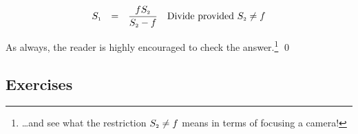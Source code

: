 \documentclass{ximera}
\begin{document}
\begin{example}
\begin{enumerate}
\[\begin{array}{rclr}
S_{\text{\tiny $1$}} & = & \dfrac{f S_{\text{\tiny $2$}}}{S_{\text{\tiny $2$}} - f} & \text{Divide provided  $S_{\text{\tiny $2$}} \neq f$}  \\

\end{array}\]

As always, the reader is highly encouraged to check the answer.\footnote{\ldots and see what the restriction $S_{\text{\tiny $2$}} \neq f$ means in terms of focusing a camera!}  \qed

\end{enumerate}

\end{example}

\newpage

\subsection{Exercises}


\closegraphsfile
\end{document}
